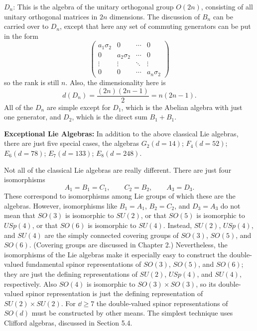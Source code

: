\noindent
$D_n$: This is the algebra of the unitary orthogonal group $O(2n)$, consisting of
all unitary orthogonal matrices in $2n$ dimensions. The discussion of $B_n$ can
be carried over to $D_n$, except that here any set of commuting generators can
be put in the form
\[
 \begin{pmatrix}
  a_1\sigma_2&0&\cdots&0\\
  0&a_2\sigma_2&\cdots&0\\
  \vdots&\vdots&\ddots&\vdots\\
  0&0&\cdots&a_n\sigma_2
 \end{pmatrix}
\]
so the rank is still $n$. Also, the dimensionality here is
\[
 d(D_n)=\frac{(2n)(2n-1)}{2}=n(2n-1) .
\]
All of the $D_n$ are simple except for $D_1$, which is the Abelian algebra with
just one generator, and $D_2$, which is the direct sum $B_1+B_1$.

\noindent
\textbf{Exceptional Lie Algebras:} In addition to the above classical Lie
algebras, there are just five special cases, the algebras $G_2(d=14)$;
$F_4(d=52)$; $E_6(d=78)$; $E_7(d=133)$; $E_8(d=248)$.

Not all of the classical Lie algebras are really different. There are just four
isomorphisms
\[
 A_1=B_1=C_1,\qquad C_2=B_2,\qquad A_3=D_3 .
\]
These correspond to isomorphisms among Lie groups of which these are the
algebras. However, isomorphisms like $B_1=A_1$, $B_2=C_2$, and $D_3=A_3$ do not
mean that $SO(3)$ is isomorphic to $SU(2)$, or that $SO(5)$ is isomorphic to
$USp(4)$, or that $SO(6)$ is isomorphic to $SU(4)$. Instead, $SU(2)$, $USp(4)$,
and $SU(4)$ are the simply connected covering groups of $SO(3)$, $SO(5)$, and
$SO(6)$. (Covering groups are discussed in Chapter 2.) Nevertheless, the
isomorphisms of the Lie algebras make it especially easy to construct the
double-valued fundamental spinor representations of $SO(3)$, $SO(5)$, and
$SO(6)$; they are just the defining representations of $SU(2)$, $USp(4)$, and
$SU(4)$, respectively. Also $SO(4)$ is isomorphic to $SO(3)\times SO(3)$, so its
double-valued spinor representation is just the defining representation of
$SU(2)\times SU(2)$. For $\dd\geq7$ the double-valued spinor representations of
$SO(d)$ must be constructed by other means. The simplest technique uses Clifford
algebras, discussed in Section 5.4.
